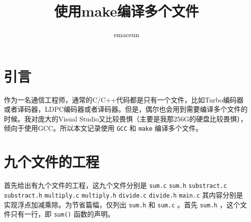 \documentclass[10pt,a4paper,UTF8]{article}
\author{emacsun}
\date{}
\title{使用make编译多个文件}
\begin{document}
\maketitle
\tableofcontents
{}

\section{引言}
\label{sec:org8c2b8b4}


作为一名通信工程师，通常的C/C++代码都是只有一个文件，比如Turbo编码器或者译码器，LDPC编码器或者译码器。但是，偶尔也会用到需要编译多个文件的时候。我对庞大的Visual Studio又比较畏惧（主要是我那256G的硬盘比较畏惧），倾向于使用GCC。所以本文记录使用 \texttt{GCC} 和 \texttt{make} 编译多个文件。
\section{九个文件的工程}
\label{sec:org097050b}


首先给出有九个文件的工程，这九个文件分别是 \texttt{sum.c} \texttt{sum.h} \texttt{substract.c} \texttt{substract.h} \texttt{multiply.c} \texttt{multiply.h} \texttt{divide.c}  \texttt{divide.h}  \texttt{main.c} 其内容分别是实现浮点加减乘除。为节省篇幅，仅列出 \texttt{sum.h} 和 \texttt{sum.c} 。首先 \texttt{sum.h} ，这个文件只有一行，即 \texttt{sum()} 函数的声明。
\end{document}
